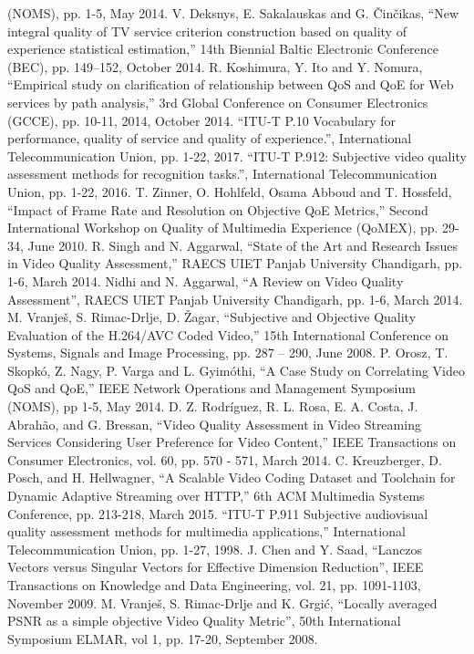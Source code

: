 \documentclass[conference]{IEEEtran}
\begin{document}
\begin{thebibliography}{99}
        (NOMS), pp. 1-5, May 2014.
        V. Deksnys, E. Sakalauskas and G. Činčikas, “New integral quality of TV service 
        criterion construction based on quality of experience statistical estimation,” 
        14th Biennial Baltic Electronic Conference (BEC), pp. 149–152, October 2014.       
        R. Koshimura, Y. Ito and Y. Nomura, “Empirical study on clarification of relationship 
        between QoS and QoE for Web services by path analysis,” 3rd Global Conference on 
        Consumer Electronics (GCCE), pp. 10-11, 2014, October 2014.
        “ITU-T P.10 Vocabulary for performance, quality of service and quality of 
        experience.”, International Telecommunication Union, pp. 1-22, 2017.
        “ITU-T P.912: Subjective video quality assessment methods for recognition tasks.”, 
        International Telecommunication Union, pp. 1-22, 2016.
        T. Zinner, O. Hohlfeld, Osama Abboud and T. Hossfeld, “Impact of Frame Rate and 
        Resolution on Objective QoE Metrics,” Second International Workshop on Quality 
        of Multimedia Experience (QoMEX), pp. 29-34, June 2010.
        R. Singh and N. Aggarwal, “State of the Art and Research Issues in Video Quality 
        Assessment,” RAECS UIET Panjab University Chandigarh, pp. 1-6, March 2014.
        Nidhi and N. Aggarwal, “A Review on Video Quality Assessment”, RAECS UIET Panjab 
        University Chandigarh, pp. 1-6, March 2014.
        M. Vranješ, S. Rimac-Drlje, D. Žagar, “Subjective and Objective Quality Evaluation 
        of the H.264/AVC Coded Video,” 15th International Conference on Systems, Signals and 
        Image Processing, pp. 287 – 290, June 2008.
        P. Orosz, T. Skopkó, Z. Nagy, P. Varga and L. Gyimóthi, “A Case Study on Correlating 
        Video QoS and QoE,” IEEE Network Operations and Management Symposium (NOMS), pp 1-5, May 
        2014.
        D. Z. Rodríguez, R. L. Rosa, E. A. Costa, J. Abrahão, and G. Bressan, “Video Quality Assessment 
        in Video Streaming Services Considering User Preference for Video Content,” IEEE 
        Transactions on Consumer Electronics, vol. 60, pp. 570 - 571, March 2014.
        C. Kreuzberger, D. Posch, and H. Hellwagner, “A Scalable Video Coding Dataset and 
        Toolchain for Dynamic Adaptive Streaming over HTTP,” 6th ACM Multimedia Systems 
        Conference, pp. 213-218, March 2015.
        “ITU-T P.911 Subjective audiovisual quality assessment methods for multimedia 
        applications,” International Telecommunication Union, pp. 1-27, 1998.
        J. Chen and Y. Saad, “Lanczos Vectors versus Singular Vectors for Effective Dimension 
        Reduction”, IEEE Transactions on Knowledge and Data Engineering, vol. 21, pp. 1091-1103, 
        November 2009.
        M. Vranješ, S. Rimac-Drlje and K. Grgić, “Locally averaged PSNR as a simple objective Video 
        Quality Metric”, 50th International Symposium ELMAR, vol 1, pp. 17-20, September 2008.

    \end{thebibliography}
\end{document}
